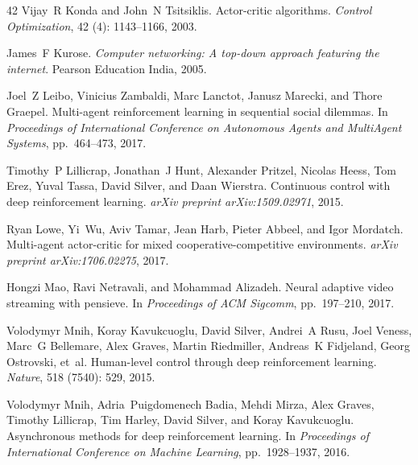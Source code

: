 \documentclass{article} %
\begin{document}
\begin{thebibliography}{42}
Vijay~R Konda and John~N Tsitsiklis.
\newblock Actor-critic algorithms.
\newblock \emph{Control Optimization}, 42 (4): 1143--1166,
  2003.

James~F Kurose.
\newblock \emph{Computer networking: A top-down approach featuring the
  internet}.
\newblock Pearson Education India, 2005.

Joel~Z Leibo, Vinicius Zambaldi, Marc Lanctot, Janusz Marecki, and Thore
  Graepel.
\newblock Multi-agent reinforcement learning in sequential social dilemmas.
\newblock In \emph{Proceedings of International Conference on Autonomous Agents
  and MultiAgent Systems}, pp.\  464--473, 2017.

Timothy~P Lillicrap, Jonathan~J Hunt, Alexander Pritzel, Nicolas Heess, Tom
  Erez, Yuval Tassa, David Silver, and Daan Wierstra.
\newblock Continuous control with deep reinforcement learning.
\newblock \emph{arXiv preprint arXiv:1509.02971}, 2015.

Ryan Lowe, Yi~Wu, Aviv Tamar, Jean Harb, Pieter Abbeel, and Igor Mordatch.
\newblock Multi-agent actor-critic for mixed cooperative-competitive
  environments.
\newblock \emph{arXiv preprint arXiv:1706.02275}, 2017.

Hongzi Mao, Ravi Netravali, and Mohammad Alizadeh.
\newblock Neural adaptive video streaming with pensieve.
\newblock In \emph{Proceedings of ACM Sigcomm}, pp.\  197--210, 2017.

Volodymyr Mnih, Koray Kavukcuoglu, David Silver, Andrei~A Rusu, Joel Veness,
  Marc~G Bellemare, Alex Graves, Martin Riedmiller, Andreas~K Fidjeland, Georg
  Ostrovski, et~al.
\newblock Human-level control through deep reinforcement learning.
\newblock \emph{Nature}, 518 (7540): 529, 2015.

Volodymyr Mnih, Adria~Puigdomenech Badia, Mehdi Mirza, Alex Graves, Timothy
  Lillicrap, Tim Harley, David Silver, and Koray Kavukcuoglu.
\newblock Asynchronous methods for deep reinforcement learning.
\newblock In \emph{Proceedings of International Conference on Machine
  Learning}, pp.\  1928--1937, 2016.


\end{thebibliography}
\end{document}
